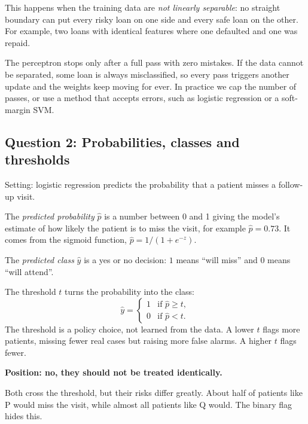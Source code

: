 This happens when the training data are \emph{not linearly separable}: no straight boundary can
put every risky loan on one side and every safe loan on the other. For example, two loans with
identical features where one defaulted and one was repaid.

The perceptron stops only after a full pass with zero mistakes. If the data cannot be separated,
some loan is always misclassified, so every pass triggers another update and the weights keep
moving for ever. In practice we cap the number of passes, or use a method that accepts errors,
such as logistic regression or a soft-margin SVM.

\subsection{Question 2: Probabilities, classes and thresholds}
Setting: logistic regression predicts the probability that a patient misses a follow-up visit.

The \emph{predicted probability} $\hat p$ is a number between 0 and 1 giving the model's
estimate of how likely the patient is to miss the visit, for example $\hat p = 0.73$. It comes
from the sigmoid function, $\hat p = 1/(1+e^{-z})$.

The \emph{predicted class} $\hat y$ is a yes or no decision: $1$ means ``will miss'' and $0$
means ``will attend''.

The threshold $t$ turns the probability into the class:
\[
  \hat y =
  \begin{cases}
    1 & \text{if } \hat p \geq t,\\
    0 & \text{if } \hat p < t.
  \end{cases}
\]
The threshold is a policy choice, not learned from the data. A lower $t$ flags more patients,
missing fewer real cases but raising more false alarms. A higher $t$ flags fewer.

\textbf{Position: no, they should not be treated identically.}

Both cross the threshold, but their risks differ greatly. About half of patients like P would
miss the visit, while almost all patients like Q would. The binary flag hides this.

